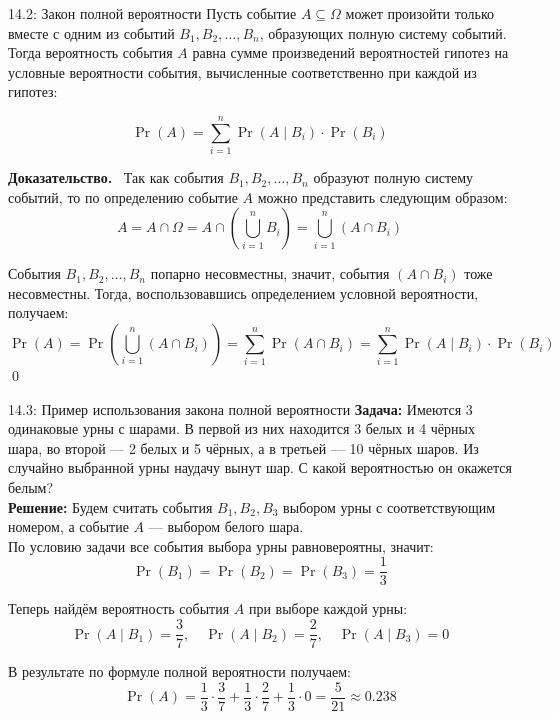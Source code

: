 \documentclass[a4paper,12pt]{article}
\newcommand{\myproof}{\textbf{Доказательство.}\ }
\begin{document}
	\begin{theorembox}{14.2: Закон полной вероятности}
		Пусть событие \(A \subseteq \Omega\) может произойти только вместе с одним из событий \(B_1, B_2, \dots, B_n\), образующих полную систему событий. Тогда вероятность события \(A\) равна сумме произведений вероятностей гипотез на условные вероятности события, вычисленные соответственно при каждой из гипотез:
		
		\[ \Pr(A) = \sum_{i=1}^n \Pr(A \mid B_i) \cdot \Pr(B_i) \]
	\end{theorembox}
	
	\myproof
	Так как события \(B_1, B_2, \dots, B_n\) образуют полную систему событий, то по определению событие \(A\) можно представить следующим образом:
	\[ A = A \cap \Omega = A \cap \left( \bigcup_{i=1}^n B_i \right) = \bigcup_{i=1}^n (A \cap B_i) \]
	
	События \(B_1, B_2, \dots, B_n\) попарно несовместны, значит, события \((A \cap B_i)\) тоже несовместны. Тогда, воспользовавшись определением условной вероятности, получаем:
	\[ \Pr(A) = \Pr\left( \bigcup_{i=1}^n (A \cap B_i) \right) = \sum_{i=1}^n \Pr(A \cap B_i) = \sum_{i=1}^n \Pr(A \mid B_i) \cdot \Pr(B_i) \]
	\qed
	
	\begin{examplebox}{14.3: Пример использования закона полной вероятности}
		\textbf{Задача:} Имеются 3 одинаковые урны с шарами. В первой из них находится 3 белых и 4 чёрных шара, во второй — 2 белых и 5 чёрных, а в третьей — 10 чёрных шаров. Из случайно выбранной урны наудачу вынут шар. С какой вероятностью он окажется белым?\\
		
		\textbf{Решение:} Будем считать события \(B_1, B_2, B_3\) выбором урны с соответствующим номером, а событие \(A\) — выбором белого шара.\\
		
		По условию задачи все события выбора урны равновероятны, значит:
		\[ \Pr(B_1) = \Pr(B_2) = \Pr(B_3) = \frac{1}{3} \]
		
		Теперь найдём вероятность события \(A\) при выборе каждой урны:
		\[ \Pr(A \mid B_1) = \frac{3}{7}, \quad \Pr(A \mid B_2) = \frac{2}{7}, \quad \Pr(A \mid B_3) = 0 \]
		
		В результате по формуле полной вероятности получаем:
		\[ \Pr(A) = \frac{1}{3} \cdot \frac{3}{7} + \frac{1}{3} \cdot \frac{2}{7} + \frac{1}{3} \cdot 0 = \frac{5}{21} \approx 0.238 \]
	\end{examplebox}
	
\end{document}
